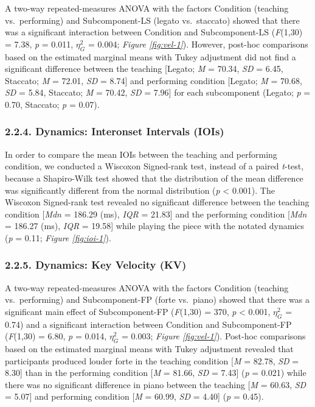 \documentclass[
  english,
  man,floatsintext]{apa6}
\begin{document}
A two-way repeated-measures ANOVA with the factors Condition (teaching vs.~performing) and Subcomponent-LS (legato vs.~staccato) showed that there was a significant interaction between Condition and Subcomponent-LS (\emph{F}(1,30) = 7.38, \emph{p} = 0.011, \(\eta_G^2\) = 0.004; \emph{Figure \ref{fig:vel-1}}). However, post-hoc comparisons based on the estimated marginal means with Tukey adjustment did not find a significant difference between the teaching {[}Legato; \emph{M} = 70.34, \emph{SD} = 6.45, Staccato; \emph{M} = 72.01, \emph{SD} = 8.74{]} and performing condition {[}Legato; \emph{M} = 70.68, \emph{SD} = 5.84, Staccato; \emph{M} = 70.42, \emph{SD} = 7.96{]} for each subcomponent (Legato; \emph{p} = 0.70, Staccato; \emph{p} = 0.07).

\hypertarget{dynamics-interonset-intervals-iois}{%
\subsubsection{2.2.4. Dynamics: Interonset Intervals (IOIs)}\label{dynamics-interonset-intervals-iois}}

In order to compare the mean IOIs between the teaching and performing condition, we conducted a Wiscoxon Signed-rank test, instead of a paired \emph{t}-test, because a Shapiro-Wilk test showed that the distribution of the mean difference was significantly different from the normal distribution (\emph{p} \textless{} 0.001). The Wiscoxon Signed-rank test revealed no significant difference between the teaching condition {[}\emph{Mdn} = 186.29 (ms), \emph{IQR} = 21.83{]} and the performing condition {[}\emph{Mdn} = 186.27 (ms), \emph{IQR} = 19.58{]} while playing the piece with the notated dynamics (\emph{p} = 0.11; \emph{Figure \ref{fig:ioi-1}}).

\hypertarget{dynamics-key-velocity-kv}{%
\subsubsection{2.2.5. Dynamics: Key Velocity (KV)}\label{dynamics-key-velocity-kv}}

A two-way repeated-measures ANOVA with the factors Condition (teaching vs.~performing) and Subcomponent-FP (forte vs.~piano) showed that there was a significant main effect of Subcomponent-FP (\emph{F}(1,30) = 370, \emph{p} \textless{} 0.001, \(\eta_G^2\) = 0.74) and a significant interaction between Condition and Subcomponent-FP (\emph{F}(1,30) = 6.80, \emph{p} = 0.014, \(\eta_G^2\) = 0.003; \emph{Figure \ref{fig:vel-1}}). Post-hoc comparisons based on the estimated marginal means with Tukey adjustment revealed that participants produced louder forte in the teaching condition {[}\emph{M} = 82.78, \emph{SD} = 8.30{]} than in the performing condition {[}\emph{M} = 81.66, \emph{SD} = 7.43{]} (\emph{p} = 0.021) while there was no significant difference in piano between the teaching {[}\emph{M} = 60.63, \emph{SD} = 5.07{]} and performing condition {[}\emph{M} = 60.99, \emph{SD} = 4.40{]} (\emph{p} = 0.45).
\end{document}
